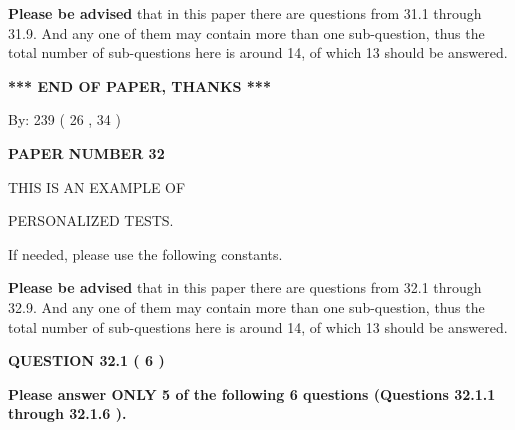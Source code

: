 \documentclass[12pt]{article}
\begin{document}
{\textbf{\large{Please be advised}}} that in this paper there are questions from
31.1 through
31.9.
And any one of them may contain more than one sub-question, thus the total number
of sub-questions here is around 14, of which
13 should be answered.
 
   
   
   
   
\vspace{1.0in} 
{\textbf{\large{ *** END OF PAPER, THANKS *** }}} 
   
   
\hspace{1.0in} By: 
         239 (          26 ,           34 )
   
   
   
   
\newpage 
\setcounter{page}{ 
    32001 } 
   
   
   
   
 {\textbf{ \Large{ PAPER NUMBER           32  }}}
   
   
\vspace{0.2in}
   
   
   
   
   
   
 \vspace{0.2in}
 
 
{\Huge  THIS IS AN EXAMPLE OF}
 
{\Huge  PERSONALIZED TESTS. }
 
If needed, please use the following constants.
 
 
 
{\textbf{\large{Please be advised}}} that in this paper there are questions from
32.1 through
32.9.
And any one of them may contain more than one sub-question, thus the total number
of sub-questions here is around 14, of which
13 should be answered.
 
\vspace{0.3in}
 
 
   
   
  
\vspace{0.2in}
  
{\textbf{\Large{QUESTION
32.1 
 (           6 )
}}}
  
  
{\textbf{\Large{Please answer ONLY  %
           5  %
 of the following  %
           6  %
 questions (Questions  %
32.1.1 %
 through  %
32.1.6 %
 ). }}}
   
   
  
\end{document}
